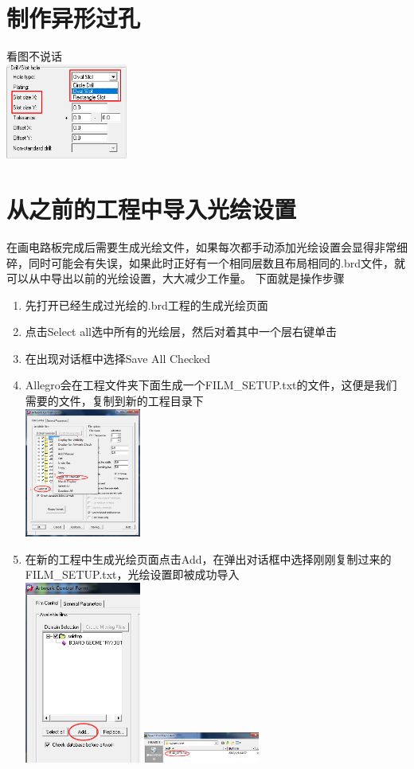 \documentclass[a4paper,twoside]{article}
\begin{document}
\section{制作异形过孔}
看图不说话\\ \includegraphics[width=0.3\textwidth]{figures/EvenViaSetting.png}

\section{从之前的工程中导入光绘设置}
在画电路板完成后需要生成光绘文件，如果每次都手动添加光绘设置会显得非常细碎，同时可能会有失误，如果此时正好有一个相同层数且布局相同的.brd文件，就可以从中导出以前的光绘设置，大大减少工作量。
下面就是操作步骤
\begin{enumerate}
	\item 先打开已经生成过光绘的.brd工程的生成光绘页面
	\item 点击Select all选中所有的光绘层，然后对着其中一个层右键单击
	\item 在出现对话框中选择Save All Checked
	\item Allegro会在工程文件夹下面生成一个FILM\_SETUP.txt的文件，这便是我们需要的文件，复制到新的工程目录下
	\\ \includegraphics[width=0.3\textwidth]{figures/ArtworkSaveAllCheck.png}
	\item 在新的工程中生成光绘页面点击Add，在弹出对话框中选择刚刚复制过来的FILM\_SETUP.txt，光绘设置即被成功导入
	\\ \includegraphics[width=0.3\textwidth]{figures/ArtworkAdd.png} \includegraphics[width=0.3\textwidth]{figures/ArtworkSelectSetting.png}

\end{enumerate}
\end{document}
